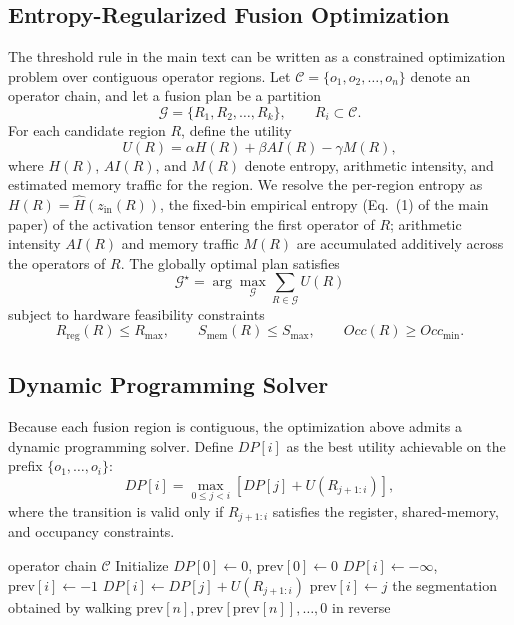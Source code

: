 \subsection{Entropy-Regularized Fusion Optimization}
The threshold rule in the main text can be written as a constrained optimization problem over contiguous operator regions. Let \(\mathcal{C} = \{o_1, o_2, \ldots, o_n\}\) denote an operator chain, and let a fusion plan be a partition
\[
\mathcal{G} = \{R_1, R_2, \ldots, R_k\}, \qquad R_i \subset \mathcal{C}.
\]
For each candidate region \(R\), define the utility
\[
U(R) = \alpha H(R) + \beta AI(R) - \gamma M(R),
\]
where \(H(R)\), \(AI(R)\), and \(M(R)\) denote entropy, arithmetic intensity, and estimated memory traffic for the region. We resolve the per-region entropy as \(H(R)=\widehat{H}(z_{\mathrm{in}}(R))\), the fixed-bin empirical entropy (Eq.~(1) of the main paper) of the activation tensor entering the first operator of \(R\); arithmetic intensity \(AI(R)\) and memory traffic \(M(R)\) are accumulated additively across the operators of \(R\). The globally optimal plan satisfies
\[
\mathcal{G}^{\star} = \arg\max_{\mathcal{G}} \sum_{R \in \mathcal{G}} U(R)
\]
subject to hardware feasibility constraints
\[
R_{\mathrm{reg}}(R) \le R_{\max}, \qquad S_{\mathrm{mem}}(R) \le S_{\max}, \qquad Occ(R) \ge Occ_{\min}.
\]

\subsection{Dynamic Programming Solver}
Because each fusion region is contiguous, the optimization above admits a dynamic programming solver. Define \(DP[i]\) as the best utility achievable on the prefix \(\{o_1, \ldots, o_i\}\):
\[
DP[i] = \max_{0 \le j < i} \left[DP[j] + U(R_{j+1:i})\right],
\]
where the transition is valid only if \(R_{j+1:i}\) satisfies the register, shared-memory, and occupancy constraints.

\begin{algorithm}[t]
\caption{Optimal Entropy-Regularized Fusion}
\label{alg:dp_fusion}
\begin{algorithmic}[1]
\Require operator chain \(\mathcal{C}\)
\State Initialize \(DP[0] \gets 0\), $\mathrm{prev}[0] \gets 0$
  \State \(DP[i] \gets -\infty\), $\mathrm{prev}[i] \gets -1$
      \State \(DP[i] \gets DP[j] + U(R_{j+1:i})\)
      \State $\mathrm{prev}[i] \gets j$ 
    \EndIf
  \EndFor
\EndFor
\State \Return the segmentation obtained by walking $\mathrm{prev}[n], \mathrm{prev}[\mathrm{prev}[n]], \ldots, 0$ in reverse
\end{algorithmic}
\end{algorithm}


